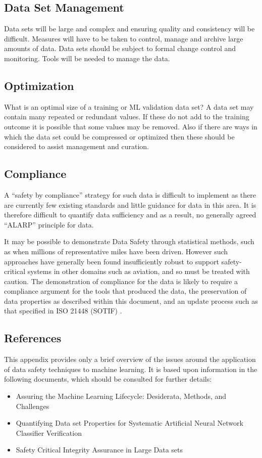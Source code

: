 \subsection{Data Set Management}
Data sets will be large and complex and ensuring quality and consistency will be difficult. Measures will have to be taken to control, manage and archive large amounts of data. Data sets should be subject to formal change control and monitoring. Tools will be needed to manage the data.

\subsection{Optimization}
What is an optimal size of a training or
\cbstart
ML
\cbend
validation data set? A data set may contain many repeated or redundant values. If these do not add to the training outcome it is possible that some values may be removed. Also if there are ways in which the data set could be compressed or optimized then these should be considered to assist management and curation.

\subsection{Compliance}
A ``safety by compliance'' strategy for such data is difficult to implement as there are currently
few existing standards and little guidance for data in this area.
It is therefore difficult to quantify data sufficiency and as a result, no generally agreed ``ALARP'' principle for data.

It may be possible to demonstrate Data Safety through statistical methods,
such as when millions of representative miles have been driven.
However such approaches have generally been found insufficiently robust to support safety-critical systems in other domains
such as aviation, and so must be treated with caution.
The demonstration of compliance for the data is likely to require a compliance argument for the tools that produced the data,
the preservation of data properties as described within this document, and an update process such as that specified in ISO 21448 (SOTIF)
\cite{citation:ISO21448}.

\subsection{References}
This appendix provides only a brief overview of the issues around the application of data safety techniques to machine learning. It is based upon information in the following documents, which should be consulted for further details:
\begin{itemize}
\item Assuring the Machine Learning Lifecycle: Desiderata, Methods, and Challenges \cite{citation:Ashmore2019}
\item Quantifying Data set Properties for Systematic Artificial Neural Network Classifier Verification \cite{citation:Hond2020}
\item Safety Critical Integrity Assurance in Large Data sets \cite{citation:Sutherland2020}
\end{itemize}
